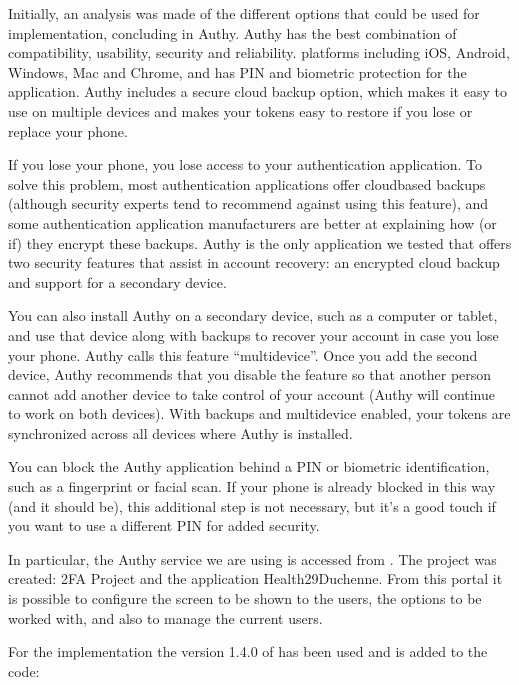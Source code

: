 \documentclass[letterpaper,10pt,english]{sphinxmanual}
\begin{document}
Initially, an analysis was made of the different options that could be used for implementation, concluding in Authy.
Authy has the best combination of compatibility, usability, security and reliability. platforms including iOS, Android, Windows, Mac and Chrome, and has PIN and biometric protection for the application. Authy includes a secure cloud backup option, which makes it easy to use on multiple devices and makes your tokens easy to restore if you lose or replace your phone.

If you lose your phone, you lose access to your authentication application. To solve this problem, most authentication applications offer cloud\sphinxhyphen{}based backups (although security experts tend to recommend against using this feature), and some authentication application manufacturers are better at explaining how (or if) they encrypt these backups. Authy is the only application we tested that offers two security features that assist in account recovery: an encrypted cloud backup and support for a secondary device.

You can also install Authy on a secondary device, such as a computer or tablet, and use that device along with backups to recover your account in case you lose your phone. Authy calls this feature “multi\sphinxhyphen{}device”. Once you add the second device, Authy recommends that you disable the feature so that another person cannot add another device to take control of your account (Authy will continue to work on both devices). With backups and multi\sphinxhyphen{}device enabled, your tokens are synchronized across all devices where Authy is installed.

You can block the Authy application behind a PIN or biometric identification, such as a fingerprint or facial scan. If your phone is already blocked in this way (and it should be), this additional step is not necessary, but it’s a good touch if you want to use a different PIN for added security.

In particular, the Authy service we are using is accessed from . The project was created: 2FA Project and the application Health29\sphinxhyphen{}Duchenne. From this portal it is possible to configure the screen to be shown to the users, the options to be worked with, and also to manage the current users.

For the implementation the version 1.4.0 of  has been used and is added to the code:
\end{document}

